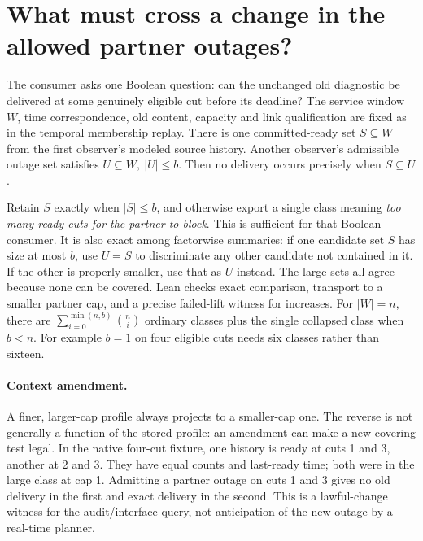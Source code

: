 \documentclass{article}
\begin{document}
\section*{What must cross a change in the allowed partner outages?}
The consumer asks one Boolean question: can the unchanged
old diagnostic be delivered at some genuinely eligible cut before
its deadline? The service window \(W\), time correspondence, old
content, capacity and link qualification are fixed as in the
temporal membership replay. There is one committed-ready set
\(S\subseteq W\) from the first observer's modeled source history.
Another observer's admissible outage set satisfies
\(U\subseteq W,\ |U|\le b\). Then no delivery occurs precisely when
\(S\subseteq U\).

Retain \(S\) exactly when \(|S|\le b\), and otherwise export a single
class meaning \emph{too many ready cuts for the partner to block}.
This is sufficient for that Boolean consumer. It is also exact
among factorwise summaries: if one candidate set \(S\) has size at
most \(b\), use \(U=S\) to discriminate any other candidate not
contained in it. If the other is properly smaller, use that as
\(U\) instead. The large sets all agree because none can be covered.
Lean checks exact comparison, transport to a smaller partner cap,
and a precise failed-lift witness for increases. For \(|W|=n\),
there are \(\sum_{i=0}^{\min(n,b)} {n\choose i}\) ordinary classes
plus the single collapsed class when \(b<n\). For example \(b=1\)
on four eligible cuts needs six classes rather than sixteen.

\paragraph{Context amendment.}
A finer, larger-cap profile always projects to a smaller-cap one.
The reverse is not generally a function of the stored profile:
an amendment can make a new covering test legal. In the native
four-cut fixture, one history is ready at cuts 1 and 3, another at
2 and 3. They have equal counts and last-ready time; both were in
the large class at cap 1. Admitting a partner outage on cuts 1
and 3 gives no old delivery in the first and exact delivery in the
second. This is a lawful-change witness for the audit/interface
query, not anticipation of the new outage by a real-time planner.
\end{document}
